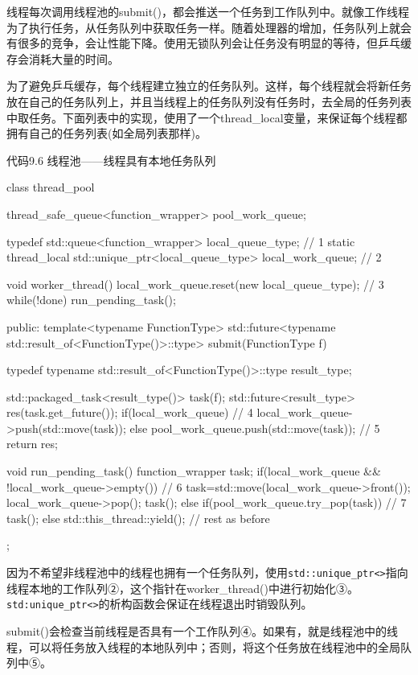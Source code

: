 
线程每次调用线程池的submit()，都会推送一个任务到工作队列中。就像工作线程为了执行任务，从任务队列中获取任务一样。随着处理器的增加，任务队列上就会有很多的竞争，会让性能下降。使用无锁队列会让任务没有明显的等待，但乒乓缓存会消耗大量的时间。

为了避免乒乓缓存，每个线程建立独立的任务队列。这样，每个线程就会将新任务放在自己的任务队列上，并且当线程上的任务队列没有任务时，去全局的任务列表中取任务。下面列表中的实现，使用了一个thread\_local变量，来保证每个线程都拥有自己的任务列表(如全局列表那样)。

代码9.6 线程池——线程具有本地任务队列

\begin{cpp}
class thread_pool
{
  thread_safe_queue<function_wrapper> pool_work_queue;

  typedef std::queue<function_wrapper> local_queue_type;  // 1
  static thread_local std::unique_ptr<local_queue_type>
    local_work_queue;  // 2

  void worker_thread()
  {
    local_work_queue.reset(new local_queue_type);  // 3
    while(!done)
    {
      run_pending_task();
    }
  }

public:
  template<typename FunctionType>
  std::future<typename std::result_of<FunctionType()>::type>
    submit(FunctionType f)
  {
    typedef typename std::result_of<FunctionType()>::type result_type;

    std::packaged_task<result_type()> task(f);
    std::future<result_type> res(task.get_future());
    if(local_work_queue)  // 4
    {
      local_work_queue->push(std::move(task));
    }
    else
    {
      pool_work_queue.push(std::move(task));  // 5
    }
    return res;
  }

  void run_pending_task()
  {
    function_wrapper task;
    if(local_work_queue && !local_work_queue->empty())  // 6
    {
      task=std::move(local_work_queue->front());
      local_work_queue->pop();
      task();
    }
    else if(pool_work_queue.try_pop(task))  // 7
    {
      task();
    }
    else
    {
      std::this_thread::yield();
    }
  }
// rest as before
};
\end{cpp}

因为不希望非线程池中的线程也拥有一个任务队列，使用\texttt{std::unique\_ptr<>}指向线程本地的工作队列②，这个指针在worker\_thread()中进行初始化③。\texttt{std:unique\_ptr<>}的析构函数会保证在线程退出时销毁队列。

submit()会检查当前线程是否具有一个工作队列④。如果有，就是线程池中的线程，可以将任务放入线程的本地队列中；否则，将这个任务放在线程池中的全局队列中⑤。

